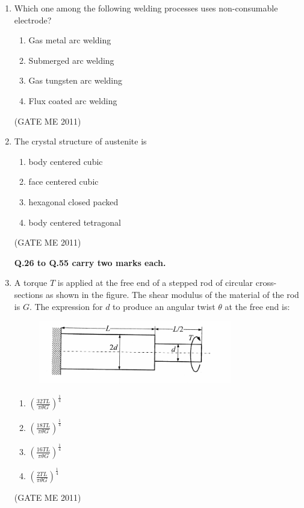 \documentclass[journal]{IEEEtran}
\begin{document}
\begin{enumerate}
\item Which one among the following welding processes uses non-consumable electrode?
\begin{multicols}{2}
\begin{enumerate}
\item Gas metal arc welding  
\item Submerged arc welding  
\item Gas tungsten arc welding  
\item Flux coated arc welding  
\end{enumerate}
\end{multicols}  
\hfill (GATE ME 2011)  

\item The crystal structure of austenite is
\begin{multicols}{2}
\begin{enumerate}
\item body centered cubic  
\item face centered cubic  
\item hexagonal closed packed  
\item body centered tetragonal  
\end{enumerate}
\end{multicols}  
\hfill (GATE ME 2011)  

\textbf{Q.26 to Q.55 carry two marks each.}

\item A torque $ T $ is applied at the free end of a stepped rod of circular cross-sections as shown in the figure. The shear modulus of the material of the rod is $ G $. The expression for $ d $ to produce an angular twist $ \theta $ at the free end is:

\begin{figure}[H]
    \centering
    \includegraphics[width=0.8\textwidth]{Fig 4.png}
    \caption{}
    \label{fig:question26}
\end{figure}

\begin{multicols}{4}
\begin{enumerate}
\item $ \left( \frac{32TL}{\pi \theta G} \right)^{\frac{1}{4}} $
\item $ \left( \frac{18TL}{\pi \theta G} \right)^{\frac{1}{4}} $
\item $ \left( \frac{16TL}{\pi \theta G} \right)^{\frac{1}{4}} $
\item $ \left( \frac{2TL}{\pi \theta G} \right)^{\frac{1}{4}} $
\end{enumerate}
\end{multicols}  
\hfill (GATE ME 2011)


\end{enumerate}
\end{document}
